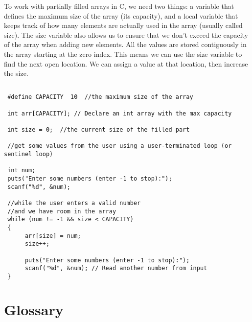 To work with partially filled arrays in C, we need two things: a variable that defines the maximum size of the array (its capacity), and a local variable that keeps track of how many elements are actually used in the array (usually called size). The size variable also allows us to ensure that we don't exceed the capacity of the array when adding new elements. All the values are stored contiguously in the array starting at the zero index. This means we can use the size variable to find the next open location. We can assign a value at that location, then increase the size.

\begin{verbatim}

 #define CAPACITY  10  //the maximum size of the array

 int arr[CAPACITY]; // Declare an int array with the max capacity 

 int size = 0;  //the current size of the filled part

 //get some values from the user using a user-terminated loop (or sentinel loop)

 int num;
 puts("Enter some numbers (enter -1 to stop):");
 scanf("%d", &num);

 //while the user enters a valid number 
 //and we have room in the array
 while (num != -1 && size < CAPACITY) 
 {
	  arr[size] = num; 	
	  size++;  

	  puts("Enter some numbers (enter -1 to stop):");
	  scanf("%d", &num); // Read another number from input
 }
\end{verbatim}
%

\section{Glossary}

